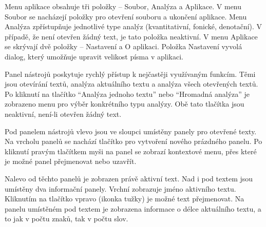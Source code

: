 \documentclass[dp.tex]{subfiles}
\begin{document}
Menu aplikace obsahuje tři položky -- Soubor, Analýza a Aplikace. V menu Soubor se nacházejí položky pro otevření souboru a ukončení aplikace. Menu Analýza zpřístupňuje jednotlivé type analýz (kvantitativní, fonické, denotační). V případě, že není otevřen žádný text, je tato položka neaktivní. V menu Aplikace se skrývají dvě položky -- Nastavení a O aplikaci. Položka Nastavení vyvolá dialog, který umožňuje upravit velikost písma v aplikaci.

Panel nástrojů poskytuje rychlý přístup k nejčastěji využívaným funkcím. Těmi jsou otevírání textů, analýza aktuálního textu a analýza všech otevřených textů. Po kliknutí na tlačítko \enquote{Analýza jednoho textu} nebo \enquote{Hromadná analýza} je zobrazeno menu pro výběr konkrétního typu analýzy. Obě tato tlačítka jsou neaktivní, není-li otevřen žádný text.

Pod panelem nástrojů vlevo jsou ve sloupci umístěny panely pro otevřené texty. Na vrcholu panelů se nachází tlačítko pro vytvoření nového prázdného panelu. Po kliknutí pravým tlačítkem myši na panel se zobrazí kontextové menu, přes které je možné panel přejmenovat nebo uzavřít.

Nalevo od těchto panelů je zobrazen právě aktivní text. Nad i pod textem jsou umístěny dva informační panely. Vrchní zobrazuje jméno aktivního textu. Kliknutím na tlačítko vpravo (ikonka tužky) je možné text přejmenovat. Na panelu umístěném pod textem je zobrazena informace o délce aktuálního textu, a to jak v počtu znaků, tak v počtu slov.
\end{document}
